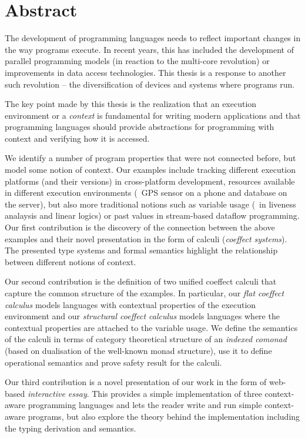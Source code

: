 
\begingroup
\let\clearpage\relax
\let\cleardoublepage\relax
\let\cleardoublepage\relax

\chapter*{Abstract} %
The development of programming languages needs to reflect important changes in the way
programs execute. In recent years, this has included the development of parallel programming
models (in reaction to the multi-core revolution) or improvements in data access technologies.
This thesis is a response to another such revolution -- the diversification of devices and
systems where programs run.

The key point made by this thesis is the realization that an execution environment or
a \emph{context} is fundamental for writing modern applications and that programming
languages should provide abstractions for programming with context and verifying how
it is accessed.

We identify a number of program properties that were not connected before, but model some notion
of context. Our examples include tracking different execution platforms (and their versions)
in cross-platform development, resources available in different execution environments (\eg~GPS
sensor on a phone and database on the server), but also more traditional notions such as
variable usage (\eg~in liveness analaysis and linear logics) or past values in
stream-based dataflow programming. Our first contribution is the discovery of the connection
between the above examples and their novel presentation in the form of calculi (\emph{coeffect systems}).
The presented type systems and formal semantics highlight the relationship between different
notions of context.

Our second contribution is the definition of two unified coeffect calculi that capture the common
structure of the examples. In particular, our \emph{flat coeffect calculus} models languages
with contextual properties of the execution environment and our \emph{structural coeffect
calculus} models languages where the contextual properties are attached to the variable usage.
We define the semantics of the calculi in terms of category theoretical structure of an
\emph{indexed comonad} (based on dualisation of the well-known monad structure), use it
to define operational semantics and prove safety result for the calculi.

Our third contribution is a novel presentation of our work in the form of web-based
\emph{interactive essay}. This provides a simple implementation of three context-aware programming
languages and lets the reader write and run simple context-aware programs, but also explore the
theory behind the implementation including the typing derivation and semantics.


\endgroup

\vfill
